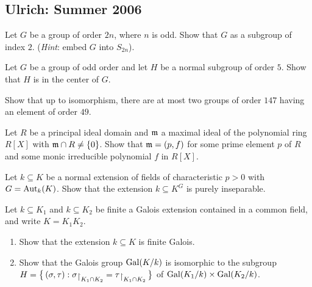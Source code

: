 \subsection{Ulrich: Summer 2006}
\setcounter{exercise}{0}
\setcounter{equation}{0}

\begin{problem}
  Let \(G\) be a group of order \(2n\), where \(n\) is odd. Show that \(G\)
  as a subgroup of index \(2\). (\emph{Hint}: embed \(G\) into
  \(S_{2n}\)).
\end{problem}
\begin{solution}
\end{solution}

\begin{problem}
  Let \(G\) be a group of odd order and let \(H\) be a normal subgroup of
  order \(5\). Show that \(H\) is in the center of \(G\).
\end{problem}
\begin{solution}
\end{solution}

\begin{problem}
  Show that up to isomorphism, there are at most two groups of order
  \(147\) having an element of order \(49\).
\end{problem}
\begin{solution}
\end{solution}

\begin{problem}
  Let \(R\) be a principal ideal domain and \(\mathfrak{m}\) a maximal ideal of
  the polynomial ring \(R[X]\) with \(\mathfrak{m}\cap R\neq \{0\}\). Show that
  \(\mathfrak{m}=(p,f)\) for some prime element \(p\) of \(R\) and some monic
  irreducible polynomial \(f\) in \(R[X]\).
\end{problem}
\begin{solution}
\end{solution}

\begin{problem}
  Let \(k\subseteq K\) be a normal extension of fields of characteristic
  \(p>0\) with \(G=\operatorname{Aut}_k(K)\). Show that the extension \(k\subseteq K^G\)
  is purely inseparable.
\end{problem}
\begin{solution}
\end{solution}

\begin{problem}
  Let \(k\subseteq K_1\) and \(k\subseteq K_2\) be finite a Galois extension
  contained in a common field, and write \(K=K_1K_2\).
  \begin{enumerate}[label=(\alph*)]
  \item Show that the extension \(k\subseteq K\) is finite Galois.
  \item Show that the Galois group \(\operatorname{Gal}(K/k)\) is isomorphic to the
    subgroup
    \(H=\bigl\{\,(\sigma,\tau):\sigma\restrict{K_1\cap
      K_2}=\tau\restrict{K_1\cap K_2}\,\bigr\}\) of
    \(\operatorname{Gal}(K_1/k)\times\operatorname{Gal}(K_2/k)\).
  \end{enumerate}
\end{problem}
\begin{solution}
\end{solution}

